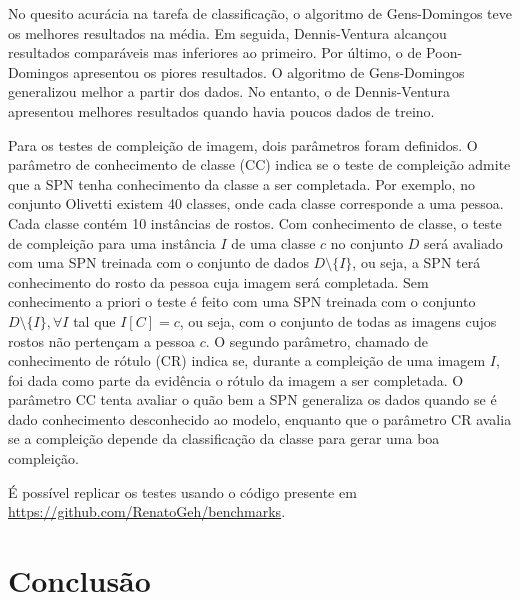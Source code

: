 \documentclass[12pt]{article}
\theoremstyle{plain}
\numberwithin{equation}{section}
\begin{document}
No quesito acurácia na tarefa de classificação, o algoritmo de Gens-Domingos teve os melhores
resultados na média. Em seguida, Dennis-Ventura alcançou resultados comparáveis mas inferiores ao
primeiro. Por último, o de Poon-Domingos apresentou os piores resultados. O algoritmo de
Gens-Domingos generalizou melhor a partir dos dados. No entanto, o de Dennis-Ventura apresentou
melhores resultados quando havia poucos dados de treino.

Para os testes de compleição de imagem, dois parâmetros foram definidos. O parâmetro de
conhecimento de classe (CC) indica se o teste de compleição admite que a SPN tenha conhecimento da
classe a ser completada. Por exemplo, no conjunto Olivetti existem 40 classes, onde cada classe
corresponde a uma pessoa. Cada classe contém 10 instâncias de rostos. Com conhecimento de classe, o
teste de compleição para uma instância $I$ de uma classe $c$ no conjunto $D$ será avaliado com uma
SPN treinada com o conjunto de dados $D\setminus\{I\}$, ou seja, a SPN terá conhecimento do rosto
da pessoa cuja imagem será completada. Sem conhecimento a priori o teste é feito com uma SPN
treinada com o conjunto $D\setminus\{I\}, \forall I$ tal que $I[C]=c$, ou seja, com o conjunto de
todas as imagens cujos rostos não pertençam a pessoa $c$. O segundo parâmetro, chamado de
conhecimento de rótulo (CR) indica se, durante a compleição de uma imagem $I$, foi dada como parte
da evidência o rótulo da imagem a ser completada. O parâmetro CC tenta avaliar o quão bem a SPN
generaliza os dados quando se é dado conhecimento desconhecido ao modelo, enquanto que o parâmetro
CR avalia se a compleição depende da classificação da classe para gerar uma boa compleição.

É possível replicar os testes usando o código presente em
\url{https://github.com/RenatoGeh/benchmarks}.

\section{Conclusão}

\printbibliography[]
\end{document}
